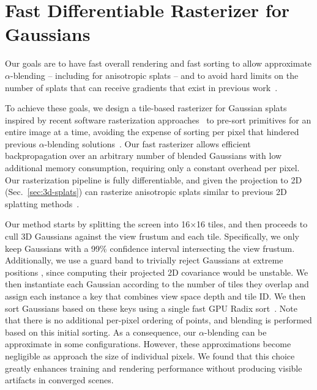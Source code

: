 \section{Fast Differentiable Rasterizer for Gaussians}
\label{sec:tile-raster}







Our goals are to have fast overall rendering and fast sorting to allow approximate $\alpha$-blending -- including for anisotropic splats -- and to avoid hard limits on the number of splats that can receive gradients that exist in previous work~\cite{Lassner_2021_CVPR}.

To achieve these goals, we design a tile-based rasterizer for Gaussian splats inspired by recent software rasterization approaches~\cite{Lassner_2021_CVPR} to pre-sort primitives for an entire image at a time, avoiding the expense of sorting per pixel that hindered previous $\alpha$-blending solutions~\cite{kopanas21,kopanas22}. Our fast rasterizer allows efficient backpropagation over an arbitrary number of blended Gaussians with low additional memory consumption, requiring only a constant overhead per pixel.
Our rasterization pipeline is fully differentiable, and given the projection to 2D (Sec.~\ref{sec:3d-splats}) can rasterize anisotropic splats similar to previous 2D splatting methods~\cite{kopanas21}.

Our method starts by splitting the screen into 16$\times$16 tiles, and then proceeds to cull 3D Gaussians against the view frustum and each tile.
Specifically, we only keep Gaussians with a 99\% confidence interval intersecting the view frustum.
Additionally, we use a guard band to trivially reject Gaussians at extreme positions , since computing their projected 2D covariance would be unstable.
We then instantiate each Gaussian according to the number of tiles they overlap and assign each instance a key that combines view space depth and tile ID. We then sort Gaussians based on these keys using a single fast GPU Radix sort~\cite{merrill2010revisiting}.
Note that there is no additional per-pixel ordering of points, and blending is performed based on this initial sorting.  As a consequence, our $\alpha$-blending can be approximate in some configurations. %
However, these approximations become negligible as  approach the size of individual pixels.
We found that this choice greatly enhances training and rendering performance without producing visible artifacts in converged scenes.


